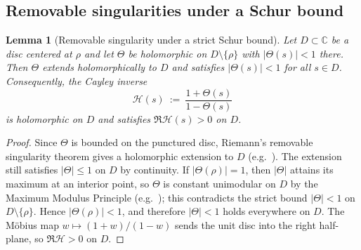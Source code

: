 \documentclass[11pt]{amsart}
\newtheorem{lemma}[theorem]{Lemma}
\theoremstyle{definition}
\theoremstyle{remark}
\newcommand{\C}{\mathbb{C}}
\begin{document}
\subsection*{Removable singularities under a Schur bound}
\begin{lemma}[Removable singularity under a strict Schur bound]\label{lem:removable-schur-p1}
Let $D\subset\C$ be a disc centered at $\rho$ and let $\Theta$ be holomorphic on $D\setminus\{\rho\}$ with $|\Theta(s)|<1$ there.
Then $\Theta$ extends holomorphically to $D$ and satisfies $|\Theta(s)|<1$ for all $s\in D$.
Consequently, the Cayley inverse
\[
  \mathcal H(s)\ :=\ \frac{1+\Theta(s)}{1-\Theta(s)}
\]
is holomorphic on $D$ and satisfies $\Re \mathcal H(s) > 0$ on $D$.
\end{lemma}
\begin{proof}
Since $\Theta$ is bounded on the punctured disc, Riemann's removable singularity theorem gives a holomorphic extension to $D$
(e.g.\ \cite[Ch.~2]{Ahlfors}).
The extension still satisfies $|\Theta|\le 1$ on $D$ by continuity.
If $|\Theta(\rho)|=1$, then $|\Theta|$ attains its maximum at an interior point, so $\Theta$ is constant unimodular on $D$
by the Maximum Modulus Principle (e.g.\ \cite[Ch.~2]{Ahlfors}); this contradicts the strict bound $|\Theta|<1$ on $D\setminus\{\rho\}$.
Hence $|\Theta(\rho)|<1$, and therefore $|\Theta|<1$ holds everywhere on $D$.
The Möbius map $w\mapsto (1+w)/(1-w)$ sends the unit disc into the right half-plane, so $\Re \mathcal H>0$ on $D$.
\end{proof}
\end{document}
